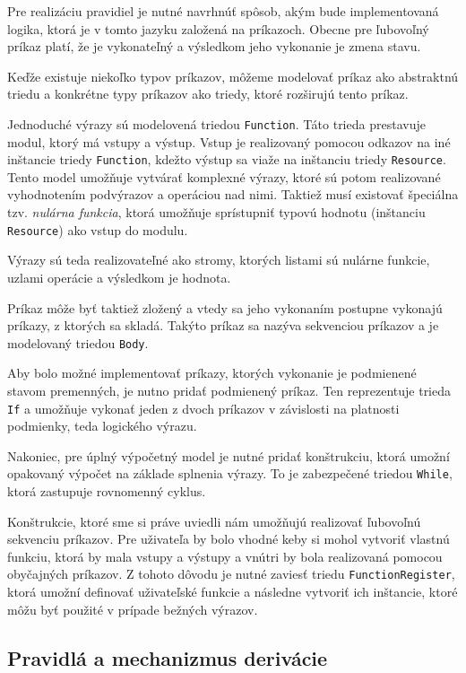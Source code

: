 Pre realizáciu pravidiel je nutné navrhnúť spôsob, akým bude implementovaná logika, ktorá je v tomto jazyku založená na príkazoch. Obecne pre ľubovoľný príkaz platí, že je vykonateľný a výsledkom jeho vykonanie je zmena stavu. 

Keďže existuje niekoľko typov príkazov, môžeme modelovať príkaz ako abstraktnú triedu a konkrétne typy príkazov ako triedy, ktoré rozširujú tento príkaz. 

Jednoduché výrazy sú modelovená triedou \texttt{Function}. Táto trieda prestavuje modul, ktorý má vstupy a výstup. Vstup je realizovaný pomocou odkazov na iné inštancie triedy
\texttt{Function}, kdežto výstup sa viaže na inštanciu triedy \texttt{Resource}. Tento model umožňuje vytvárať komplexné výrazy, ktoré sú potom realizované vyhodnotením podvýrazov a operáciou nad nimi. Taktiež musí existovať špeciálna tzv. \textit{nulárna funkcia}, ktorá umožňuje sprístupniť typovú hodnotu (inštanciu \texttt{Resource}) ako vstup do modulu.

Výrazy sú teda realizovateľné ako stromy, ktorých listami sú nulárne funkcie, uzlami operácie a výsledkom je hodnota.

Príkaz môže byť taktiež zložený a vtedy sa jeho vykonaním postupne vykonajú príkazy, z ktorých sa skladá. Takýto príkaz sa nazýva sekvenciou príkazov a je modelovaný triedou \texttt{Body}. 

Aby bolo možné implementovať príkazy, ktorých vykonanie je podmienené stavom premenných, je nutno pridať podmienený príkaz. Ten reprezentuje trieda \texttt{If} a umožňuje vykonať jeden z dvoch príkazov v závislosti na platnosti podmienky, teda logického výrazu.

Nakoniec, pre úplný výpočetný model je nutné pridať konštrukciu, ktorá umožní opakovaný výpočet na základe splnenia výrazy. To je zabezpečené triedou \texttt{While}, ktorá zastupuje rovnomenný cyklus.

Konštrukcie, ktoré sme si práve uviedli nám umožňujú realizovať ľubovoľnú sekvenciu príkazov. Pre uživateľa by bolo vhodné keby si mohol vytvoriť vlastnú funkciu, ktorá by mala vstupy a výstupy a vnútri by bola realizovaná pomocou obyčajných príkazov. Z tohoto dôvodu je nutné zaviesť triedu \texttt{FunctionRegister}, ktorá umožní definovať uživateľské funkcie a následne vytvoriť ich inštancie, ktoré môžu byť použité v prípade bežných výrazov.

\subsection{Pravidlá a mechanizmus derivácie}



